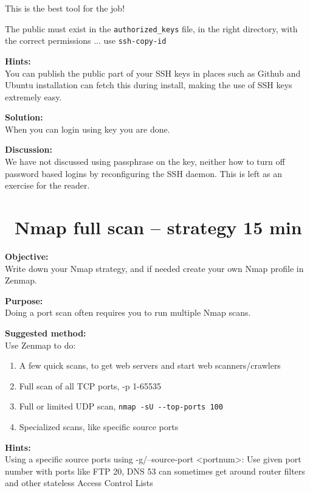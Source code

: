 \documentclass[a4paper,11pt,notitlepage]{report}
\begin{document}
\vskip 5mm

\centerline{This is the best tool for the job!}

The public must exist in the \verb+authorized_keys+ file, in the right directory, with the correct permissions ... use \verb+ssh-copy-id+

{\bf Hints:}\\
You can publish the public part of your SSH keys in places such as Github and Ubuntu installation can fetch this during install, making the use of SSH keys extremely easy.

{\bf Solution:}\\
When you can login using key you are done.

{\bf Discussion:}\\
We have not discussed using passphrase on the key, neither how to turn off password based logins by reconfiguring the SSH daemon. This is left as an exercise for the reader.



\chapter{\faExclamationTriangle\ Nmap full scan -- strategy 15 min}
\label{ex:nmap-strategy}


{\bf Objective:} \\
Write down your Nmap strategy, and if needed create your own Nmap profile in Zenmap.


{\bf Purpose:}\\
Doing a port scan often requires you to run multiple Nmap scans.


{\bf Suggested method:}\\
Use Zenmap to do:
\begin{enumerate}
\item A few quick scans, to get web servers and start web scanners/crawlers
\item Full scan of all TCP ports, -p 1-65535
\item Full or limited UDP scan, \verb+nmap -sU --top-ports 100+
\item Specialized scans, like specific source ports
\end{enumerate}


{\bf Hints:} \\
Using a specific source ports using -g/--source-port <portnum>: Use given port number with ports like FTP 20, DNS 53 can sometimes get around router filters and other stateless Access Control Lists
\end{document}
